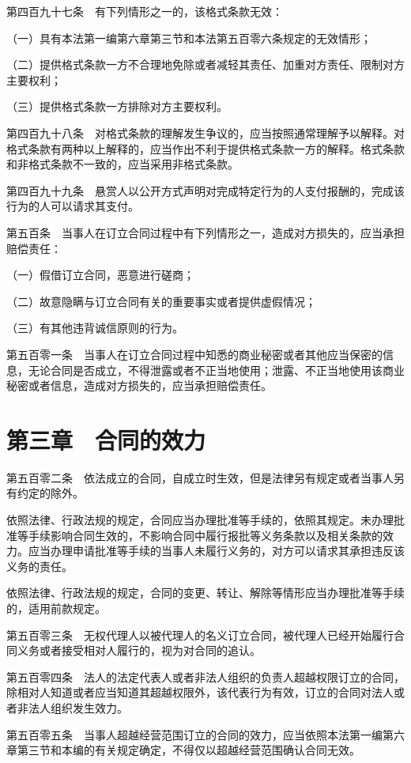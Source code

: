 \documentclass[UTF8,12pt,a4paper]{ctexbook}
\begin{document}
第四百九十七条　有下列情形之一的，该格式条款无效：

（一）具有本法第一编第六章第三节和本法第五百零六条规定的无效情形；

（二）提供格式条款一方不合理地免除或者减轻其责任、加重对方责任、限制对方主要权利；

（三）提供格式条款一方排除对方主要权利。

第四百九十八条　对格式条款的理解发生争议的，应当按照通常理解予以解释。对格式条款有两种以上解释的，应当作出不利于提供格式条款一方的解释。格式条款和非格式条款不一致的，应当采用非格式条款。

第四百九十九条　悬赏人以公开方式声明对完成特定行为的人支付报酬的，完成该行为的人可以请求其支付。

第五百条　当事人在订立合同过程中有下列情形之一，造成对方损失的，应当承担赔偿责任：

（一）假借订立合同，恶意进行磋商；

（二）故意隐瞒与订立合同有关的重要事实或者提供虚假情况；

（三）有其他违背诚信原则的行为。

第五百零一条　当事人在订立合同过程中知悉的商业秘密或者其他应当保密的信息，无论合同是否成立，不得泄露或者不正当地使用；泄露、不正当地使用该商业秘密或者信息，造成对方损失的，应当承担赔偿责任。

\section*{第三章　合同的效力}

第五百零二条　依法成立的合同，自成立时生效，但是法律另有规定或者当事人另有约定的除外。

依照法律、行政法规的规定，合同应当办理批准等手续的，依照其规定。未办理批准等手续影响合同生效的，不影响合同中履行报批等义务条款以及相关条款的效力。应当办理申请批准等手续的当事人未履行义务的，对方可以请求其承担违反该义务的责任。

依照法律、行政法规的规定，合同的变更、转让、解除等情形应当办理批准等手续的，适用前款规定。

第五百零三条　无权代理人以被代理人的名义订立合同，被代理人已经开始履行合同义务或者接受相对人履行的，视为对合同的追认。

第五百零四条　法人的法定代表人或者非法人组织的负责人超越权限订立的合同，除相对人知道或者应当知道其超越权限外，该代表行为有效，订立的合同对法人或者非法人组织发生效力。

第五百零五条　当事人超越经营范围订立的合同的效力，应当依照本法第一编第六章第三节和本编的有关规定确定，不得仅以超越经营范围确认合同无效。
\end{document}
